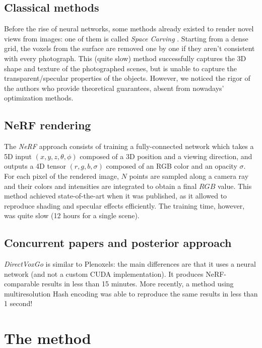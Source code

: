 \documentclass{article}
\begin{document}
\subsection{Classical methods}

Before the rise of neural networks, some methods already existed to render novel views from images: one of them is called \textit{Space Carving} \cite{spacecarving}. Starting from a dense grid, the voxels from the surface are removed one by one if they aren't consistent with every photograph. This (quite slow) method successfully captures the 3D shape and texture of the photographed scenes, but is unable to capture the transparent/specular properties of the objects. However, we noticed the rigor of the authors who provide theoretical guarantees, absent from nowadays' optimization methods.

\subsection{NeRF rendering}

The \textit{NeRF} \cite{nerf} approach consists of training a fully-connected network which takes a 5D input $(x,y,z,\theta,\phi)$ composed of a 3D position and a viewing direction, and outputs a 4D tensor $(r, g, b, \sigma)$ composed of an RGB color and an opacity $\sigma$. For each pixel of the rendered image, $N$ points are sampled along a camera ray and their colors and intensities are integrated to obtain a final $RGB$ value. This method achieved state-of-the-art when it was published, as it allowed to reproduce shading and specular effects efficiently. The training time, however, was quite slow (12 hours for a single scene).

\subsection{Concurrent papers and posterior approach}

\textit{DirectVoxGo} \cite{directvoxgo} is similar to Plenoxels: the main differences are that it uses a neural network (and not a custom CUDA implementation). It produces NeRF-comparable results in less than 15 minutes. More recently, a method using multiresolution Hash encoding \cite{instant} was able to reproduce the same results in less than 1 second!

\section{The method}\label{sec:method}
\end{document}
